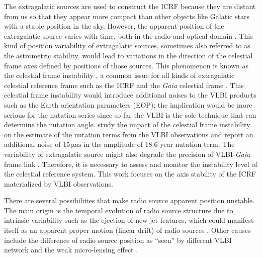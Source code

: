 \documentclass{aa}
\begin{document}
    The extragalatic sources are used to construct the ICRF because they are distant from us so that they appear more compact than other objects like Galatic stars with a stable position in the sky.
    However, the apparent position of the extragalatic source varies with time, both in the radio and optical domain \cite[e.g., see][]{2009jsrs.conf..199A,2013A&A...553A.122L}.
    This kind of position variability of extragalatic sources, sometimes also referred to as the astrometric stability, would lead to variations in the direction of the celestial frame axes defined by positions of those sources.
    This phenomenon is known as the celestial frame instability \cite[e.g.,][]{2008A&A...481..535L}, a common issue for all kinds of extragalatic celestial reference frame such as the ICRF and the \textit{Gaia} celestial frame \cite[\textit{Gaia}-CRF;][]{2018A&A...616A..14G}.
    This celestial frame instability would introduce additional noises to the VLBI products such as the Earth orientation parameters (EOP); the implication would be more serious for the nutation series since so far the VLBI is the sole technique that can determine the nutation angle.
    \citet{2003JGRB..108.2275D,2008A&A...481..535L} study the impact of the celestial frame instability on the estimate of the nutation terms from the VLBI observations and report an additional noise of $\mathrm{15\,\mu as}$ in the amplitude of 18.6-year nutation term.
    The variability of extragalatic source might also degrade the precision of VLBI-\textit{Gaia} frame link \citep{2013A&A...552A..98T,2016A&A...587A.112T,2018A&A...611A..52T}.
    Therefore, it is necessary to assess and monitor the instability level of the celestial reference system.
    This work focuses on the axis stability of the ICRF materialized by VLBI observations.
    
    There are several possibilities that make radio source apparent position unstable.
    The main origin is the temporal evolution of radio source structure due to intrinsic variability such as the ejection of new jet features, which could manifest itself as an apparent proper motion (linear drift) of radio sources \citep{2011AJ....141...91F,2011AJ....141..178M}.
    Other causes include the difference of radio source position as ``seen'' by different VLBI network \citep{2003JGRB..108.2275D} and the weak micro-lensing effect \citep{1998MNRAS.300..287S}.    
    
\end{document}
